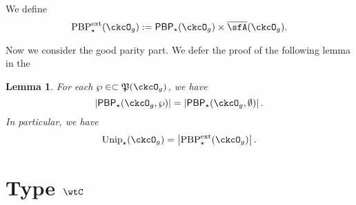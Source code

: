 \documentclass[12pt,a4paper]{amsart}
\def\abs#1{\left|{#1}\right|}
\newcommand{\CQ}{{\mathcal {Q}}}
\newcommand{\sgn}{\operatorname{sgn}}
\numberwithin{equation}{section}
\newtheorem{lem}[thm]{Lemma}
\theoremstyle{remark}
\def\Unip{\mathrm{Unip}}
\def\Cint#1{\Coh_{[#1]}}
\def\Coh{\mathrm{Coh}}
\def\CQ{\overline{\sfA}}%
\def\CPP{\mathfrak{P}}
\def\PBPes{\mathrm{PBP}^{\mathrm{ext}}_{\star}}
\def\PBP{\mathsf{PBP}}
\def\sP{\wp}
\begin{document}

We define
\[
 \PBPes(\ckcO_{g}) := \PBP_{\star}(\ckcO_{g})\times \CQ(\ckcO_{g}).
\]

Now we consider the good parity part. We defer the proof of the following lemma
in the 

\begin{lem}
  For each $\sP\in \subset \CPP(\ckcO_{g})$,
  we have
  \[
    \abs{\PBP_{\star}(\ckcO_{g},\sP)} =
    \abs{\PBP_{\star}(\ckcO_{g},\emptyset)}.
  \]
  In particular, we have
  \[
    \Unip_{\star}(\ckcO_{g}) = \abs{\PBPes(\ckcO_{g})}.
  \]
\end{lem}

\section{Type $\wtC$}
\end{document}
